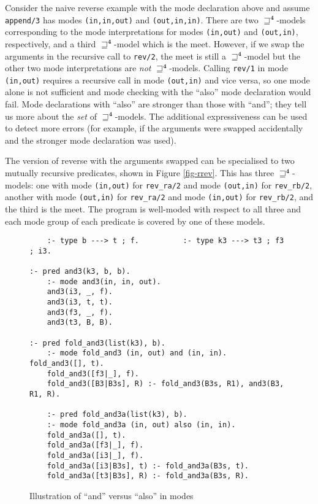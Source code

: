 \documentclass{tlp}
\newcommand{\Quad}{\ensuremath{\mathbf{4}}}
\begin{document}
Consider the naive reverse example with the mode declaration above
and assume \texttt{append/3} has modes \texttt{(in,in,out)} and
\texttt{(out,in,in)}.  There are two $\sqsupseteq^\Quad$-models
corresponding to the mode interpretations for modes
\texttt{(in,out)} and \texttt{(out,in)}, respectively, and a third
$\sqsupseteq^\Quad$-model which is the meet.  However, if we swap the
arguments in the recursive call to \texttt{rev/2}, the meet is still
a $\sqsupseteq^\Quad$-model but the other two mode interpretations are
\emph{not} $\sqsupseteq^\Quad$-models.  Calling \texttt{rev/1} in mode
\texttt{(in,out)} requires a recursive call in mode \texttt{(out,in)}
and vice versa, so one mode alone is not sufficient and mode checking
with the ``also'' mode declaration would fail.  Mode declarations with
``also'' are stronger than those with ``and''; they tell us more about the
\emph{set} of $\sqsupseteq^\Quad$-models.  The additional expressiveness
can be used to detect more errors (for example, if the arguments were
swapped accidentally and the stronger mode declaration was used).

The version of reverse with the arguments swapped can be specialised
to two mutually recursive predicates, shown in Figure \ref{fig-rrev}.
This has three $\sqsupseteq^\Quad$-models: one with mode \texttt{(in,out)}
for \texttt{rev\_ra/2} and mode \texttt{(out,in)} for \texttt{rev\_rb/2},
another with mode \texttt{(out,in)} for \texttt{rev\_ra/2} and mode
\texttt{(in,out)} for \texttt{rev\_rb/2}, and the third is the meet.
The program is well-moded with respect to all three and each mode group
of each predicate is covered by one of these models.

\begin{figure}
\begin{verbatim}
    :- type b ---> t ; f.          :- type k3 ---> t3 ; f3 ; i3.  

:- pred and3(k3, b, b).
    :- mode and3(in, in, out).
    and3(i3, _, f).
    and3(i3, t, t).
    and3(f3, _, f).
    and3(t3, B, B).
    
:- pred fold_and3(list(k3), b).
    :- mode fold_and3 (in, out) and (in, in).  fold_and3([], t).
    fold_and3([f3|_], f).
    fold_and3([B3|B3s], R) :- fold_and3(B3s, R1), and3(B3, R1, R).
    
    :- pred fold_and3a(list(k3), b).
    :- mode fold_and3a (in, out) also (in, in).
    fold_and3a([], t).
    fold_and3a([f3|_], f).
    fold_and3a([i3|_], f).
    fold_and3a([i3|B3s], t) :- fold_and3a(B3s, t).
    fold_and3a([t3|B3s], R) :- fold_and3a(B3s, R).
\end{verbatim}
\caption{Illustration of ``and'' versus ``also'' in modes\label{fig-and3}}
\end{figure}
\end{document}
